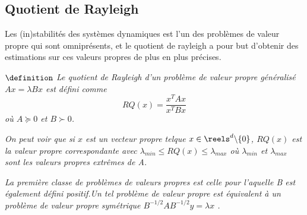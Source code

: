 \subsection{Quotient de Rayleigh}

Les (in)stabilités des systèmes dynamiques est l'un des problèmes de valeur propre qui sont omniprésents, et le quotient de rayleigh a pour but d'obtenir des estimations sur ces valeurs propres de plus en plus précises.


$\definition$ \textit{Le quotient de Rayleigh d'un problème de valeur propre généralisé $Ax = \lambda Bx$ est défini comme 
$$ RQ(x)= \frac{x^{T}Ax}{x^{T}Bx}$$
 où $A \succeq 0$ et $B \succ 0$.}

\textit{On peut voir que si $x$ est un vecteur propre telque $x \in \reels^{d} \backslash \{0\}$, $RQ (x)$ est la valeur propre correspondante avec $ \lambda_{min} \leq RQ(x) \leq \lambda_{max}$ où $\lambda_{min}$ et $\lambda_{max}$ sont les valeurs propres extrêmes de A.}

 
\textit{La premi\`ere classe de probl\`emes de valeurs propres est celle pour l'aquelle B est également défini positif.Un tel problème de valeur propre est équivalent \`a un probl\`eme de valeur propre symétrique $B^{-1 / 2}AB^{-1/2}y=\lambda x$ \cite{Ren-Cang}.}








